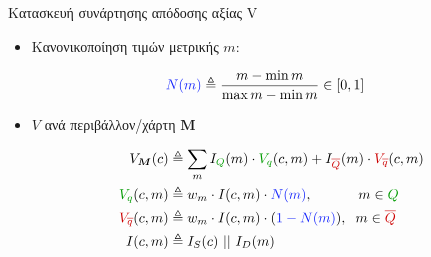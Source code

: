 \begin{frame}{Κατασκευή συνάρτησης απόδοσης αξίας V}


  \begin{itemize}
    \item<1->Κανονικοποίηση τιμών μετρικής $m$:

          \begin{align}
            \textcolor{b}{N(m)} &\triangleq \dfrac{m - \min m}{\max m - \min m} \in [0,1] \nonumber
          \end{align}

    \item<2-> $V$ ανά περιβάλλον/χάρτη $\bm{M}$

          \begin{align}
            V_{\bm{M}}(c) &\triangleq \sum\limits_{m} I_{\textcolor{g}{Q}}(m) \cdot \textcolor{g}{V_q}(c,m) + I_{\textcolor{r}{\overline{Q}}}(m) \cdot \textcolor{r}{V_{\overline{q}}}(c,m) \nonumber \\
            \textcolor{g}{V_q}(c,m) &\triangleq  w_m \cdot I(c,m) \cdot \textcolor{b}{N(m)}, \hspace{1.15cm} m \in \textcolor{g}{Q}\nonumber \\
            \textcolor{r}{V_{\overline{q}}}(c,m) &\triangleq  w_m \cdot I(c,m) \cdot( \textcolor{b}{1 - N(m)}), \hspace{0.2cm} m \in \textcolor{r}{\overline{Q}} \nonumber \\
            I(c,m) &\triangleq I_S(c)\ ||\ I_D(m) \nonumber
          \end{align}

  \end{itemize}


\end{frame}
